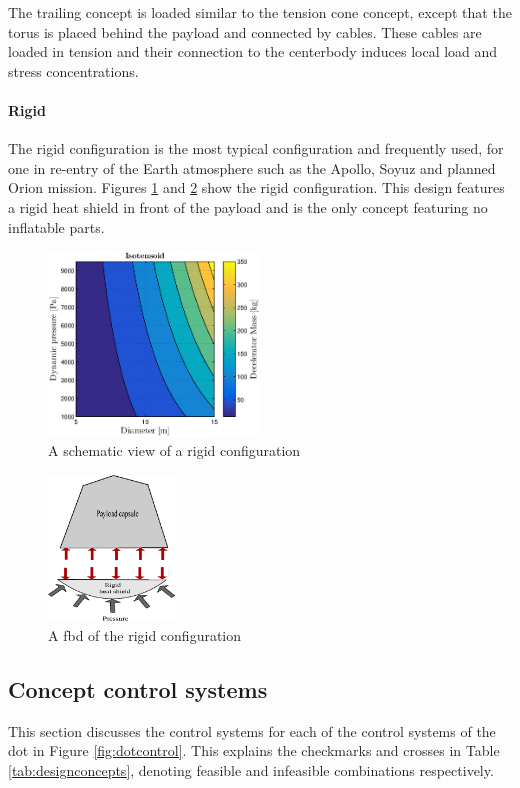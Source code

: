 The trailing concept is loaded similar to the tension cone concept, except that the torus is placed behind the payload and connected by cables. These cables are loaded in tension and their connection to the centerbody induces local load and stress concentrations.

\paragraph{Rigid}

The rigid configuration is the most typical configuration and frequently used, for one in re-entry of the Earth atmosphere such as the Apollo, Soyuz and planned Orion mission. Figures \ref{fig:conc_rigid} and \ref{fig:fbd_rigid} show the rigid configuration. This design features a rigid heat shield in front of the payload and is the only concept featuring no inflatable parts.

\begin{figure}[H]
\centering
\includegraphics[width = 0.5\textwidth]{Figure/ISO_comp.eps}
\caption{A schematic view of a rigid configuration}
\label{fig:conc_rigid}
\end{figure}

\begin{figure}[H]
\centering
\includegraphics[width = 0.3\textwidth]{Figure/FBD_rigid.eps}
\caption{A \gls{fbd} of the rigid configuration}
\label{fig:fbd_rigid}
\end{figure}

\subsection{Concept control systems} \label{sec:ccs}
This section discusses the control systems for each of the control systems of the \gls{dot} in Figure  \ref{fig:dotcontrol}. This explains the checkmarks and crosses in Table \ref{tab:designconcepts}, denoting feasible and infeasible combinations respectively.

